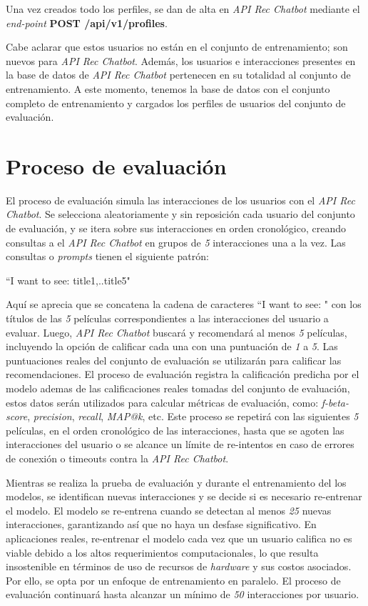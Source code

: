 \documentclass[11pt,a4paper,twoside]{thesis}
\newcommand{\quotes}[1]{``#1"}
\begin{document}
Una vez creados todo los perfiles, se dan de alta en \textit{API Rec Chatbot} mediante el \textit{end-point} \textbf{POST /api/v1/profiles}.

Cabe aclarar que estos usuarios no están en el conjunto de entrenamiento; son nuevos para \textit{API Rec Chatbot}. Además, los usuarios e interacciones presentes en la base de datos de \textit{API Rec Chatbot} pertenecen en su totalidad al conjunto de entrenamiento. A este momento, tenemos la base de datos con el conjunto completo de entrenamiento y cargados los perfiles de usuarios del conjunto de evaluación.

\section{Proceso de evaluación}

El proceso de evaluación simula las interacciones de los usuarios con el \textit{API Rec Chatbot}. Se selecciona aleatoriamente y sin reposición cada usuario del conjunto de evaluación, y se itera sobre sus interacciones en orden cronológico, creando consultas a el \textit{API Rec Chatbot} en grupos de \textit{5} interacciones una a la vez. Las consultas o \textit{prompts} tienen el siguiente patrón:


\begin{center}\quotes{I want to see: title1,..title5}\end{center}

Aquí se aprecia que se concatena la cadena de caracteres \quotes{I want to see: } con los títulos de las \textit{5} películas correspondientes a las interacciones del usuario a evaluar. Luego, \textit{API Rec Chatbot} buscará y recomendará al menos \textit{5} películas, incluyendo la opción de calificar cada una con una puntuación de \textit{1} a \textit{5}. Las puntuaciones reales del conjunto de evaluación se utilizarán para calificar las recomendaciones. El proceso de evaluación registra la calificación predicha por el modelo ademas de las calificaciones reales tomadas del conjunto de evaluación, estos datos serán utilizados para calcular métricas de evaluación, como: \textit{f-beta-score}, \textit{precision}, \textit{recall}, \textit{MAP@k}, etc. Este proceso se repetirá con las siguientes \textit{5} películas, en el orden cronológico de las interacciones, hasta que se agoten las interacciones del usuario o se alcance un límite de re-intentos en caso de errores de conexión o timeouts contra la \textit{API Rec Chatbot}.

Mientras se realiza la prueba de evaluación y durante el entrenamiento del los modelos, se identifican nuevas interacciones y se decide si es necesario re-entrenar el modelo. El modelo se re-entrena cuando se detectan al menos \textit{25} nuevas interacciones, garantizando así que no haya un desfase significativo. En aplicaciones reales, re-entrenar el modelo cada vez que un usuario califica no es viable debido a los altos requerimientos computacionales, lo que resulta insostenible en términos de uso de recursos de \textit{hardware} y sus  costos asociados. Por ello, se opta por un enfoque de entrenamiento en paralelo. El proceso de evaluación continuará hasta alcanzar un mínimo de \textit{50} interacciones por usuario.
\end{document}
